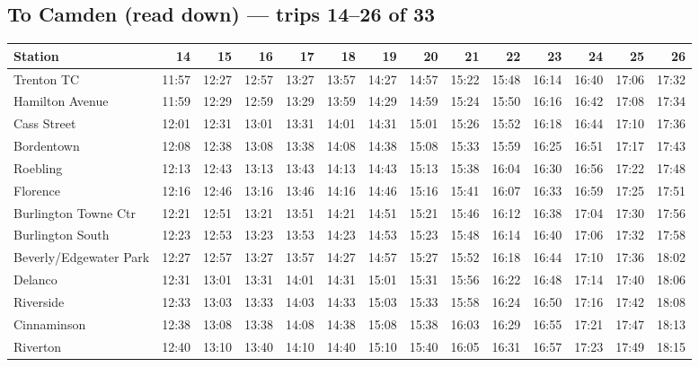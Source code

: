 \subsection*{To Camden (read down) --- trips 14--26 of 33}
\begin{center}\footnotesize\setlength{\tabcolsep}{3pt}\begin{tabular}{@{}lrrrrrrrrrrrrr@{}}\toprule
Station & 14 & 15 & 16 & 17 & 18 & 19 & 20 & 21 & 22 & 23 & 24 & 25 & 26 \\\midrule
Trenton TC & 11:57 & 12:27 & 12:57 & 13:27 & 13:57 & 14:27 & 14:57 & 15:22 & 15:48 & 16:14 & 16:40 & 17:06 & 17:32 \\
Hamilton Avenue & 11:59 & 12:29 & 12:59 & 13:29 & 13:59 & 14:29 & 14:59 & 15:24 & 15:50 & 16:16 & 16:42 & 17:08 & 17:34 \\
Cass Street & 12:01 & 12:31 & 13:01 & 13:31 & 14:01 & 14:31 & 15:01 & 15:26 & 15:52 & 16:18 & 16:44 & 17:10 & 17:36 \\
Bordentown & 12:08 & 12:38 & 13:08 & 13:38 & 14:08 & 14:38 & 15:08 & 15:33 & 15:59 & 16:25 & 16:51 & 17:17 & 17:43 \\
Roebling & 12:13 & 12:43 & 13:13 & 13:43 & 14:13 & 14:43 & 15:13 & 15:38 & 16:04 & 16:30 & 16:56 & 17:22 & 17:48 \\
Florence & 12:16 & 12:46 & 13:16 & 13:46 & 14:16 & 14:46 & 15:16 & 15:41 & 16:07 & 16:33 & 16:59 & 17:25 & 17:51 \\
Burlington Towne Ctr & 12:21 & 12:51 & 13:21 & 13:51 & 14:21 & 14:51 & 15:21 & 15:46 & 16:12 & 16:38 & 17:04 & 17:30 & 17:56 \\
Burlington South & 12:23 & 12:53 & 13:23 & 13:53 & 14:23 & 14:53 & 15:23 & 15:48 & 16:14 & 16:40 & 17:06 & 17:32 & 17:58 \\
Beverly/Edgewater Park & 12:27 & 12:57 & 13:27 & 13:57 & 14:27 & 14:57 & 15:27 & 15:52 & 16:18 & 16:44 & 17:10 & 17:36 & 18:02 \\
Delanco & 12:31 & 13:01 & 13:31 & 14:01 & 14:31 & 15:01 & 15:31 & 15:56 & 16:22 & 16:48 & 17:14 & 17:40 & 18:06 \\
Riverside & 12:33 & 13:03 & 13:33 & 14:03 & 14:33 & 15:03 & 15:33 & 15:58 & 16:24 & 16:50 & 17:16 & 17:42 & 18:08 \\
Cinnaminson & 12:38 & 13:08 & 13:38 & 14:08 & 14:38 & 15:08 & 15:38 & 16:03 & 16:29 & 16:55 & 17:21 & 17:47 & 18:13 \\
Riverton & 12:40 & 13:10 & 13:40 & 14:10 & 14:40 & 15:10 & 15:40 & 16:05 & 16:31 & 16:57 & 17:23 & 17:49 & 18:15 \\

\end{tabular}
\end{center}
